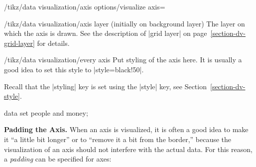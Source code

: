 \begin{key}{/tikz/data visualization/axis options/visualize axis=}
  \begin{stylekey}{/tikz/data visualization/axis layer (initially on
      background layer)}
    The layer on which the axis is drawn. See the description of
    |grid layer| on page~\ref{section-dv-grid-layer} for details.
  \end{stylekey}
  
  \begin{stylekey}{/tikz/data visualization/every axis}
    Put styling of the axis here. It is usually a good idea to set
    this style to |style={black!50}|.
  \end{stylekey}

  Recall that the |styling| key is set using the |style| key, see
  Section~\ref{section-dv-style}. 
\tikzset{
}
\begin{codeexample}[]
\tikz \datavisualization [
    our system,
    x axis={attribute=time, length=4cm},
    left axis ={attribute=money},
    right axis={attribute=people},
    visualize as line/.list={people 1, people 2, money 1, money 2}]
  data set {people and money};  
\end{codeexample}
  
  \medskip
  \textbf{Padding the Axis.}
  When an axis is visualized, it is often a good idea to make it ``a
  little bit longer'' or to ``remove it a bit from the border,'' because
  the visualization of an axis should not interfere with the actual
  data. For this reason, a \emph{padding} can be specified for axes:
  

\end{key}
